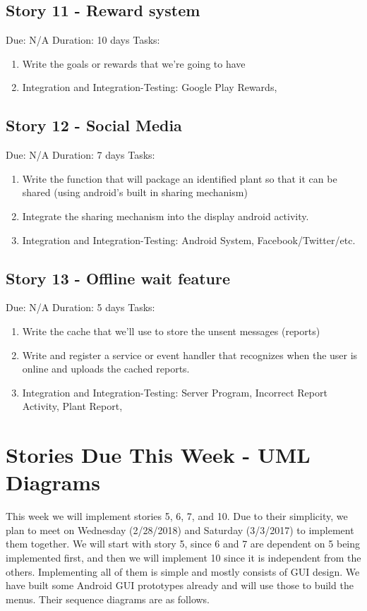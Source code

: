 \documentclass[a4paper]{article}
\begin{document}
\subsection{Story 11 - Reward system}
Due: N/A
\newline
Duration: 10 days 
\newline
Tasks:
\begin{enumerate}
\item Write the goals or rewards that we're going to have
\item Integration and Integration-Testing: Google Play Rewards, 
\end{enumerate}
\subsection{Story 12 - Social Media}
Due: N/A
\newline
Duration: 7 days 
\newline
Tasks:
\begin{enumerate}
\item Write the function that will package an identified plant so that it can be shared (using android's built in sharing mechanism)
\item Integrate the sharing mechanism into the display android activity.
\item Integration and Integration-Testing: Android System, Facebook/Twitter/etc.
\end{enumerate}
\subsection{Story 13 - Offline wait feature}
Due: N/A
\newline
Duration: 5 days 
\newline
Tasks:
\begin{enumerate}
\item Write the cache that we'll use to store the unsent messages (reports)
\item Write and register a service or event handler that recognizes when the user is online and uploads the cached reports.
\item Integration and Integration-Testing: Server Program, Incorrect Report Activity, Plant Report, 
\end{enumerate}

\pagebreak
\section{Stories Due This Week - UML Diagrams}
This week we will implement stories 5, 6, 7, and 10. Due to their simplicity, we plan to meet on Wednesday (2/28/2018) and Saturday (3/3/2017) to implement them together. We will start with story 5, since 6 and 7 are dependent on 5 being implemented first, and then we will implement 10 since it is independent from the others. Implementing all of them is simple and mostly consists of GUI design. We have built some Android GUI prototypes already and will use those to build the menus. Their sequence diagrams are as follows.
\end{document}
